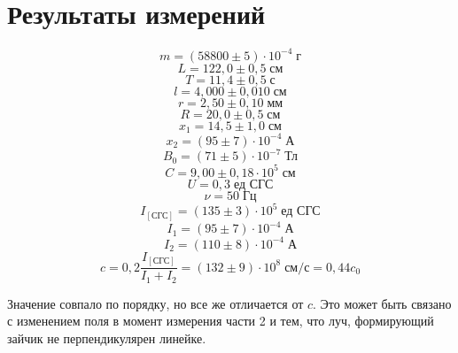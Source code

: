 \section{Результаты измерений}
\[
    m = \left(58800 \pm 5\right)\cdot 10^{-4}\;\text{г}
\]
\[
    L = 122{,}0 \pm 0{,}5\;\text{см}
\]
\[
    T = 11{,}4 \pm 0{,}5\;\text{с}
\]
\[
    l = 4{,}000 \pm 0{,}010\;\text{см}
\]
\[
   r = 2{,}50 \pm 0{,}10\;\text{мм}  
\]
\[
    R = 20{,}0 \pm 0{,}5\;\text{см}
\]
\[
    x_{1} = 14{,}5 \pm 1{,}0\;\text{см}
\]
\[
    x_{2} = \left(95 \pm 7\right)\cdot 10^{-4}\;\text{А}
\]
\[
    B_{0} = \left(71 \pm 5\right)\cdot 10^{-7}\;\text{Тл}
\]
\[
    C = 9{,}00\pm 0{,}18 \cdot 10^{5}\;\text{см} 
\]
\[
    U = 0{,}3\;\text{ед СГС}
\]
\[
    \nu = 50\;\text{Гц}
\]
\[
    I_{\left[\text{СГС}\right]} = \left(135 \pm 3\right)\cdot 10^{5}\;\text{ед СГС}
\]
\[
    I_{1} = \left(95 \pm 7\right)\cdot 10^{-4}\;\text{А}
\]
\[
    I_{2} = \left(110 \pm 8\right)\cdot 10^{-4}\;\text{А}
\]
\[
    c = 0{,}2 \frac{I_{\left[\text{СГС}\right]}}{I_{1} + I_{2}} = \left(132 \pm 9\right)\cdot 10^{8}\;\text{см} / \text{с} = 0{,}44 c_{0}
\]

Значение совпало по порядку, но все же отличается от $c$. Это может быть связано с изменением поля в момент измерения части 2 и тем, что луч, формирующий зайчик не перпендикулярен линейке.

